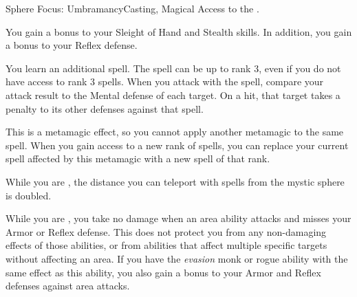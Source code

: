   \begin{magicalfeat}{Sphere Focus: Umbramancy}{Casting, Magical}
    \featpre Access to the  .

     You gain a  bonus to your Sleight of Hand and Stealth skills.
    In addition, you gain a  bonus to your Reflex defense.

     You learn an additional spell.
    The spell can be up to rank 3, even if you do not have access to rank 3 spells.
    When you attack with the spell, compare your attack result to the Mental defense of each  target.
    On a hit, that target takes a  penalty to its other defenses against that spell.

    This is a metamagic effect, so you cannot apply another metamagic to the same spell.
    When you gain access to a new rank of spells, you can replace your current spell affected by this metamagic with a new spell of that rank.

     While you are , the distance you can teleport with spells from the  mystic sphere is doubled.

     While you are , you take no damage when an area ability attacks and misses your Armor or Reflex defense.
    This does not protect you from any non-damaging effects of those abilities, or from abilities that affect multiple specific targets without affecting an area.
    If you have the \textit{evasion} monk or rogue ability with the same effect as this ability, you also gain a  bonus to your Armor and Reflex defenses against area attacks.
  \end{magicalfeat}

